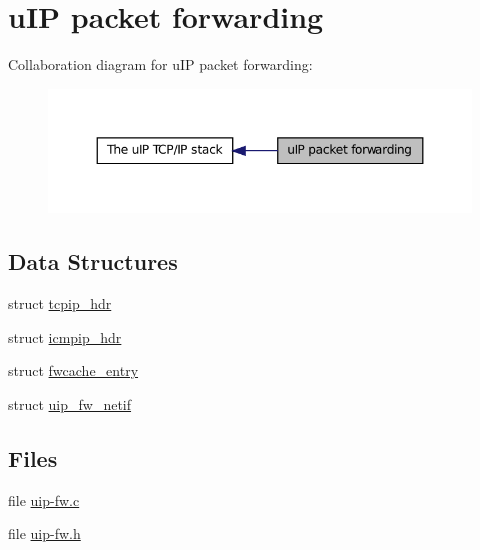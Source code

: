 \hypertarget{group__uipfw}{
\section{uIP packet forwarding}
\label{group__uipfw}
}


Collaboration diagram for uIP packet forwarding:
\nopagebreak
\begin{figure}[H]
\begin{center}
\leavevmode
\includegraphics[width=348pt]{group__uipfw}
\end{center}
\end{figure}


\subsection*{Data Structures}
\begin{DoxyCompactItemize}
\item 
struct \hyperlink{structtcpip__hdr}{tcpip\_\-hdr}
\item 
struct \hyperlink{structicmpip__hdr}{icmpip\_\-hdr}
\item 
struct \hyperlink{structfwcache__entry}{fwcache\_\-entry}
\item 
struct \hyperlink{structuip__fw__netif}{uip\_\-fw\_\-netif}
\end{DoxyCompactItemize}
\subsection*{Files}
\begin{DoxyCompactItemize}
\item 
file \hyperlink{uip-fw_8c}{uip-\/fw.c}
\item 
file \hyperlink{uip-fw_8h}{uip-\/fw.h}
\end{DoxyCompactItemize}
